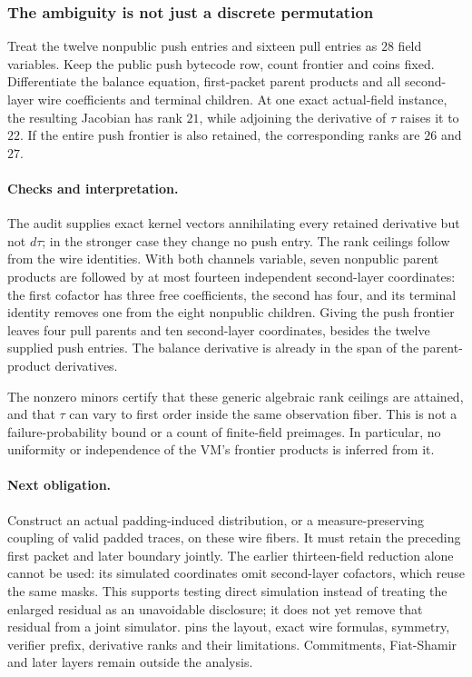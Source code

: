 \subsubsection{The ambiguity is not just a discrete permutation}

Treat the twelve nonpublic push entries and sixteen pull entries as $28$ field variables. Keep the public push bytecode row, count frontier and coins fixed. Differentiate the balance equation, first-packet parent products and all second-layer wire coefficients and terminal children. At one exact actual-field instance, the resulting Jacobian has rank $21$, while adjoining the derivative of $\tau$ raises it to $22$. If the entire push frontier is also retained, the corresponding ranks are $26$ and $27$.

\paragraph{Checks and interpretation.} The audit supplies exact kernel vectors annihilating every retained derivative but not $d\tau$; in the stronger case they change no push entry. The rank ceilings follow from the wire identities. With both channels variable, seven nonpublic parent products are followed by at most fourteen independent second-layer coordinates: the first cofactor has three free coefficients, the second has four, and its terminal identity removes one from the eight nonpublic children. Giving the push frontier leaves four pull parents and ten second-layer coordinates, besides the twelve supplied push entries. The balance derivative is already in the span of the parent-product derivatives.

The nonzero minors certify that these generic algebraic rank ceilings are attained, and that $\tau$ can vary to first order inside the same observation fiber. This is not a failure-probability bound or a count of finite-field preimages. In particular, no uniformity or independence of the VM's frontier products is inferred from it.

\paragraph{Next obligation.} Construct an actual padding-induced distribution, or a measure-preserving coupling of valid padded traces, on these wire fibers. It must retain the preceding first packet and later boundary jointly. The earlier thirteen-field reduction alone cannot be used: its simulated coordinates omit second-layer cofactors, which reuse the same masks. This supports testing direct simulation instead of treating the enlarged residual as an unavoidable disclosure; it does not yet remove that residual from a joint simulator.  pins the layout, exact wire formulas, symmetry, verifier prefix, derivative ranks and their limitations. Commitments, Fiat-Shamir and later layers remain outside the analysis.


